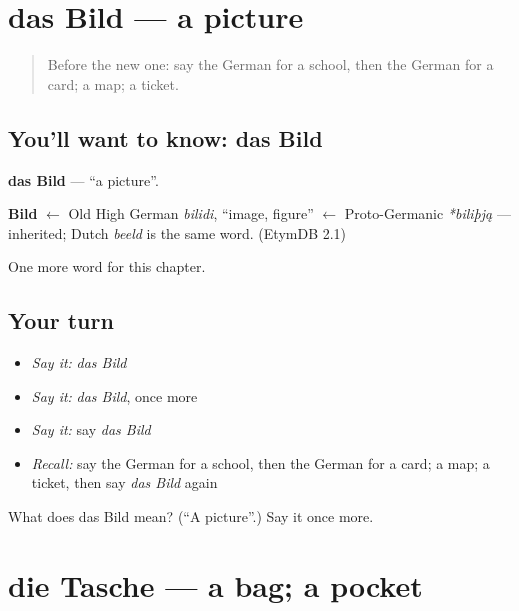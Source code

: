 \section[das Bild]{das Bild — a picture}

\label{lesson:GE-C81-bild}



\begin{quote}
Before the new one: say the German for a school, then the German for a card; a map; a ticket.
\end{quote}

\subsection*{You'll want to know: das Bild}
\textbf{das Bild} — \textquotedblleft{}a picture\textquotedblright{}.

\begin{cousinweb}
\textbf{Bild} $\leftarrow$ Old High German \emph{bilidi}, \textquotedblleft{}image, figure\textquotedblright{} $\leftarrow$ Proto-Germanic \emph{*biliþją} — inherited; Dutch \emph{beeld} is the same word. (EtymDB 2.1)
\end{cousinweb}

\begin{grammarlens}[title={What you've built}]
One more word for this chapter.
\end{grammarlens}

\subsection*{Your turn}
\begin{itemize}
\raggedright
  \item \emph{Say it:} \emph{das Bild}
  \item \emph{Say it:} \emph{das Bild}, once more
  \item \emph{Say it:} say \emph{das Bild}
  \item \emph{Recall:} say the German for a school, then the German for a card; a map; a ticket, then say \emph{das Bild} again
\end{itemize}

\begin{tcolorbox}[breakable,colback=teal!4,colframe=teal!35!black,title={Before you move on}]
What does das Bild mean? (\textquotedblleft{}A picture\textquotedblright{}.) Say it once more.
\end{tcolorbox}
\section[die Tasche]{die Tasche — a bag; a pocket}

